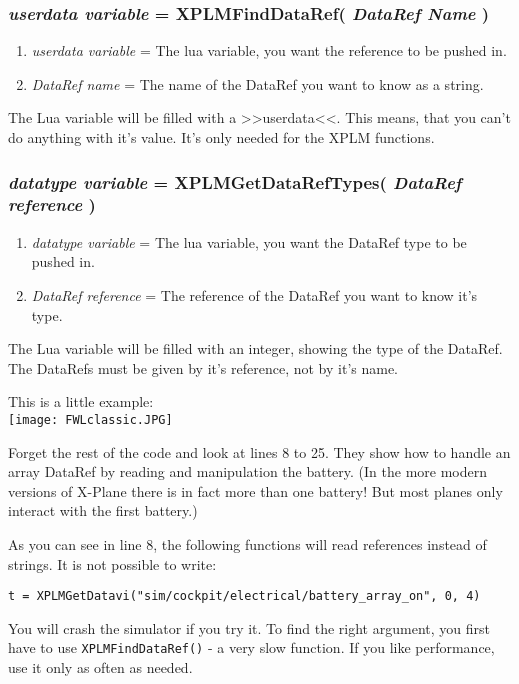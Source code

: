 \documentclass[11pt,parskip=half,a4paper]{scrartcl}
\begin{document}
\subsubsection{\emph{userdata variable} = XPLMFindDataRef( \emph{DataRef Name} )}

\begin{enumerate}
	\item \emph{userdata variable} = The lua variable, you want the reference to be pushed in.
	\item \emph{DataRef name} = The name of the DataRef you want to know as a string.
\end{enumerate}

The Lua variable will be filled with a >>userdata<<. This means, that you can't do anything with it's value. It's only needed for the XPLM functions.

\subsubsection{\emph{datatype variable} = XPLMGetDataRefTypes( \emph{DataRef reference} )}

\begin{enumerate}
	\item \emph{datatype variable} = The lua variable, you want the DataRef type to be pushed in.
	\item \emph{DataRef reference} = The reference of the DataRef you want to know it's type.
\end{enumerate}

The Lua variable will be filled with an integer, showing the type of the DataRef. The DataRefs must be given by it's reference, not by it's name.

\newpage
This is a little example:\\
\texttt{[image: FWLclassic.JPG]}

Forget the rest of the code and look at lines 8 to 25. They show how to handle an array DataRef by reading and manipulation the battery. (In the more modern versions of X-Plane there is in fact more than one battery! But most planes only interact with the first battery.)

As you can see in line 8, the following functions will read references instead of strings. It is not possible to write:

\verb|t = XPLMGetDatavi("sim/cockpit/electrical/battery_array_on", 0, 4)|

You will crash the simulator if you try it. To find the right argument, you first have to use \verb|XPLMFindDataRef()| - a very slow function. If you like performance, use it only as often as needed.
\end{document}
